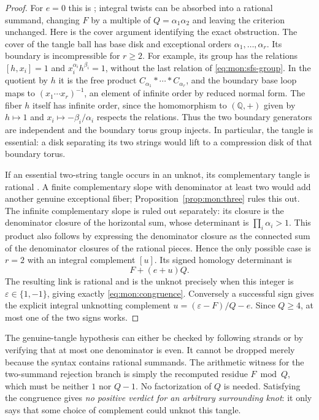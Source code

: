 \documentclass[11pt,a4paper]{article}
\theoremstyle{definition}
\theoremstyle{remark}
\numberwithin{equation}{section}
\begin{document}
\begin{proof}
For $e=0$ this is \cite[Theorem~4.9(a)]{nogueira-salgueiro}; integral twists
can be absorbed into a rational summand, changing $F$ by a multiple of
$Q=\alpha_1\alpha_2$ and leaving the criterion unchanged.
Here is the cover argument identifying the exact obstruction.
The cover of the tangle ball has base disk and exceptional orders
$\alpha_1,\ldots,\alpha_r$.  Its boundary is incompressible for $r\ge2$.
For example, its group has the relations $[h,x_i]=1$ and
$x_i^{\alpha_i}h^{\beta_i}=1$, without the last relation of
\eqref{eq:mon:sfs-group}.  In the quotient by $h$ it is the free product
$C_{\alpha_1}*\cdots*C_{\alpha_r}$, and the boundary base loop maps to
$(x_1\cdots x_r)^{-1}$, an element of infinite order by reduced normal form.
The fiber $h$ itself has infinite order, since the homomorphism to
$(\mathbb Q,+)$ given by $h\mapsto1$ and
$x_i\mapsto-\beta_i/\alpha_i$ respects the relations.  Thus the two
boundary generators are independent and the boundary torus group injects.
In particular, the tangle is essential: a disk separating its two strings
would lift to a compression disk of that boundary torus.

If an essential two-string tangle occurs in an unknot, its complementary
tangle is rational \cite[Proposition~4.4]{nogueira-salgueiro}.
A finite complementary slope with denominator at least two would add another
genuine exceptional fiber; Proposition~\ref{prop:mon:three} rules this out.
The infinite complementary slope is ruled out separately: its closure is the
denominator closure of the horizontal sum, whose determinant is
$\prod_i\alpha_i>1$.  This product also follows by expressing the
denominator closure as the connected sum of the denominator closures of the
rational pieces.  Hence the only possible case is $r=2$ with an integral
complement $[u]$.  Its signed homology determinant is
\[
 F+(e+u)Q.
\]
The resulting link is rational and is the unknot precisely when this integer
is $\varepsilon\in\{1,-1\}$, giving exactly
\eqref{eq:mon:congruence}.  Conversely a successful sign gives the explicit
integral unknotting complement $u=(\varepsilon-F)/Q-e$.
Since $Q\ge4$, at most one of the two signs works.
\end{proof}

The genuine-tangle hypothesis can either be checked by following strands or
by verifying that at most one denominator is even.  It cannot be dropped
merely because the syntax contains rational summands.  The arithmetic witness
for the two-summand rejection branch is simply the recomputed residue
$F\bmod Q$, which must be neither $1$ nor $Q-1$.  No factorization of $Q$ is
needed.  Satisfying the congruence gives \emph{no positive verdict for an
arbitrary surrounding knot}: it only says that some choice of complement
could unknot this tangle.
\end{document}

